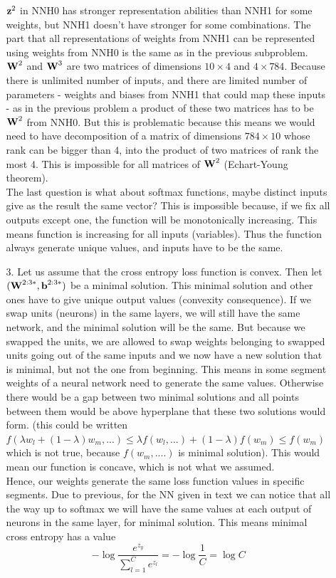 \documentclass[10pt,a4paper]{article}
\begin{document}
\begin{enumerate}
\begin{enumerate}
$\textbf{\text{{z}}}^2$ in  NNH0 has stronger representation abilities than NNH1 for some weights, but NNH1 doesn't have stronger for some combinations. The part that all representations of weights from NNH1 can be represented using weights from NNH0 is the same as in the previous subproblem.\\
$\textbf{\text{{W}}}^2$ and $\textbf{\text{{W}}}^3$ are two matrices of dimensions $10\times 4$ and $4 \times 784$. Because there is unlimited number of inputs, and there  are limited number of parameters - weights and biases from NNH1 that could map these inputs - as in the previous problem a product of these two matrices has to be $\textbf{\text{{W}}}^2$ from NNH0. But this is problematic because this means we would need to have decomposition of a matrix of dimensions $784\times10$ whose rank can be bigger than 4, into the product of two matrices of rank the most 4. This is impossible for all matrices of $\textbf{\text{{W}}}^2$ (Echart-Young theorem).
\\ The last question is what about softmax functions, maybe distinct inputs give as the result the same vector? This is impossible because, if we fix all outputs except one, the function will be monotonically increasing. This means function is increasing for all inputs (variables). Thus the function always generate unique values, and inputs have to be the same.   
\item[3.]
Let us assume that the cross entropy loss function is convex. Then let $(\textbf{\text{{W}}}^{2:3*}, \textbf{\text{{b}}}^{2:3*})$ be a minimal solution. This minimal solution and other ones have to give unique output values (convexity consequence). If we swap units (neurons) in the same layers, we will still have the same network, and the minimal solution will be the same. But because we swapped the units, we are allowed to swap weights belonging to swapped units going out of the same inputs and we now have a new solution that is minimal, but not the one from beginning. This means in some segment weights of a neural network need to generate the same values. Otherwise there would be a gap between two minimal solutions and all points between them would be above hyperplane that these two solutions would form. (this could be written $f(\lambda w_l + (1-\lambda )w_m, ...)\leq \lambda f(w_l, ...) + (1-\lambda)f(w_m) \leq f(w_m)$ which is not true, because $f(w_m,....)$ is minimal solution). This would mean our function is concave, which is not what we assumed. 
\\ 
Hence, our weights generate the same loss function values in specific segments. Due to previous, for the NN given in text we can notice that all the way up to softmax we will have the same values at each output of neurons in the same layer, for minimal solution. This means minimal cross entropy has a value $$-\log \frac{e^{z_y}}{\sum_{l=1}^Ce^{z_l}}=-\log \frac{1}{C} = \log C$$ 

\end{enumerate}
\end{enumerate}
\end{document}
